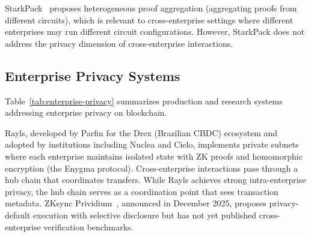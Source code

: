 StarkPack~\cite{starkpack2024} proposes heterogeneous proof aggregation
(aggregating proofs from different circuits), which is relevant to
cross-enterprise settings where different enterprises may run different
circuit configurations. However, StarkPack does not address the privacy
dimension of cross-enterprise interactions.

\subsection{Enterprise Privacy Systems}

Table~\ref{tab:enterprise-privacy} summarizes production and research systems
addressing enterprise privacy on blockchain.

\begin{table}[htbp]
\centering
\caption{Enterprise Privacy Systems Comparison}
\label{tab:enterprise-privacy}
\end{table}

Rayls, developed by Parfin for the Drex (Brazilian CBDC) ecosystem and
adopted by institutions including Nuclea and Cielo, implements private subnets
where each enterprise maintains isolated state with ZK proofs and homomorphic
encryption (the Enygma protocol). Cross-enterprise interactions pass through
a hub chain that coordinates transfers. While Rayls achieves strong
intra-enterprise privacy, the hub chain serves as a coordination point that
sees transaction metadata. ZKsync Prividium~\cite{zksync2025prividium},
announced in December 2025, proposes privacy-default execution with selective
disclosure but has not yet published cross-enterprise verification benchmarks.


